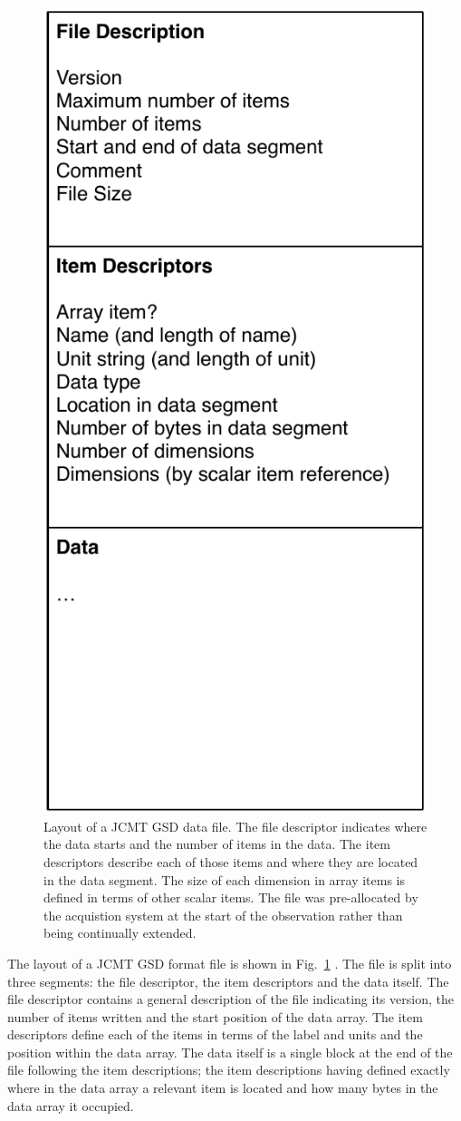 \documentclass[final,authoryear,5p,times,twocolumn]{elsarticle}
\begin{document}
\begin{figure}[t]
\begin{center}
\includegraphics[width=0.5\columnwidth]{gsd-file-layout}
\end{center}
\caption{Layout of a JCMT GSD data file. The file descriptor indicates
where the data starts and the number of items in the data. The item
descriptors describe each of those items and where they are located in
the data segment. The size of each dimension in array items is defined
in terms of other scalar items. The file was pre-allocated by the
acquistion system at the start of the observation rather than being
continually extended.}
\label{fig:jcmtgsd}
\end{figure}

The layout of a JCMT GSD format file is shown in
Fig.~\ref{fig:jcmtgsd} \citep[see also][]{mtdn84}. The file is split
into three segments: the file descriptor, the item descriptors and the
data itself. The file descriptor contains a general description of the
file indicating its version, the number of items written and the start
position of the data array. The item descriptors define each of the
items in terms of the label and units and the position within the data
array. The data itself is a single block at the end of the file
following the item descriptions; the item descriptions having defined
exactly where in the data array a relevant item is located and how
many bytes in the data array it occupied.
\end{document}
